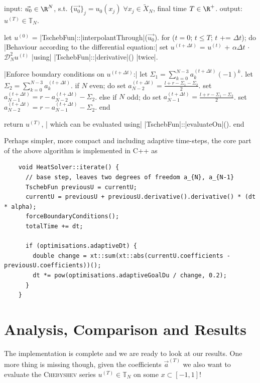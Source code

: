 \documentclass[12pt, a4paper]{article}
\newcommand{\chebyshev}{\textsc{Chebyshev}\xspace}
\begin{document}
  \begin{algorithm}[language=pseudo,caption={\centering Our final solving algorithm}]
input: $\vec{u_0} \in \R^N$, s.t. $\{\vec{u_0}\}_j = u_0(x_j) \; \forall x_j \in \tilde{X}_N$, final time $T \in \R^+$.
output: $u^{(T)} \in \mathbb{T}_N$.

let $u^{(0)}$ = |\color{themecolor3}TschebFun|::|\color{themecolor2}interpolantThrough|($\vec{u_0}$).
for ($t = 0$; $t \le T$; $t$ += $\Delta t$); do
  |\rm\color{gray}Behaviour according to the differential equation:|
  set $u^{(t+\Delta t)}$ = $u^{(t)}$ + $\alpha \Delta t$ $\cdot$ $\mathcal{D}_N^2 u^{(t)}$ |\rm\color{gray}using| |\color{themecolor3}TschebFun|::|\color{themecolor2}derivative|() |\rm\color{gray}twice|.

  |\rm\color{gray}Enforce boundary conditions on $u^{(t+\Delta t)}$:|
  let $\Sigma_1 = \sum_{k=0}^{N-3} a_k^{(t+\Delta t)} (-1)^k$.
  let $\Sigma_2 = \sum_{k=0}^{N-3} a_k^{(t+\Delta t)}$.
  if $N$ even; do
    set $a_{N-2}^{(t+\Delta t)} = \frac{l+r-\Sigma_1-\Sigma_2}{2}$.
    set $a_{N-1}^{(t+\Delta t)} = r - a_{N-2}^{(t+\Delta t)} - \Sigma_2$.
  else if $N$ odd; do
    set $a_{N-1}^{(t+\Delta t)} = \frac{l+r-\Sigma_1-\Sigma_2}{2}$.
    set $a_{N-2}^{(t+\Delta t)} = r - a_{N-1}^{(t+\Delta t)} - \Sigma_2$.
  end

  return $u^{(T)}$, |\rm\color{gray} which can be evaluated using| |\color{themecolor3}TschebFun|::|\color{themecolor2}evaluateOn|().
end
  \end{algorithm}

  Perhaps simpler, more compact and including adaptive time-steps, the core part of the above algorithm is implemented in C++ as
  \begin{verbatim}
    void HeatSolver::iterate() {
      // base step, leaves two degrees of freedom a_{N}, a_{N-1}
      TschebFun previousU = currentU;
      currentU = previousU + previousU.derivative().derivative() * (dt * alpha);
      forceBoundaryConditions();
      totalTime += dt;

      if (optimisations.adaptiveDt) {
        double change = xt::sum(xt::abs(currentU.coefficients - previousU.coefficients))();
        dt *= pow(optimisations.adaptiveGoalDu / change, 0.2);
      }
    }
  \end{verbatim}

  \section{Analysis, Comparison and Results}
  The implementation is complete and we are ready to look at our results.
  One more thing is missing though, given the coefficients $\vec{a}^{(T)}$ we also want to evaluate the \chebyshev series $u^{(T)} \in \mathbb{T}_N$ on some $x \subset [-1, 1]$!
\end{document}
